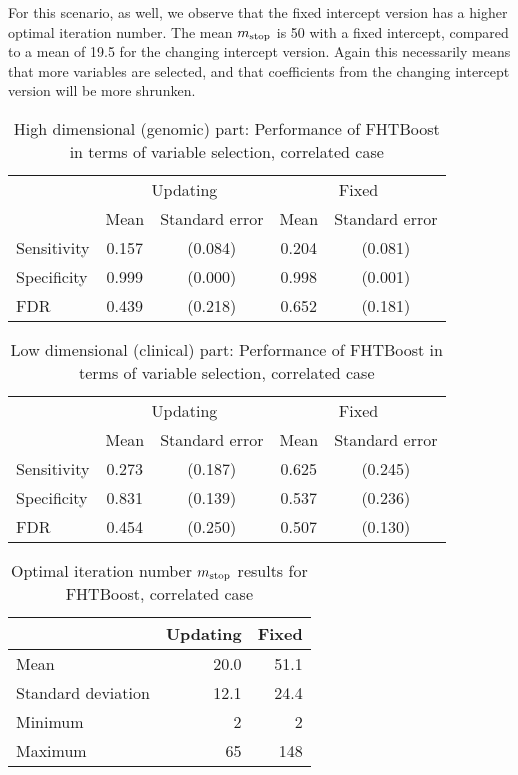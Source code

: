 For this scenario, as well, we observe that the fixed intercept version has a higher optimal iteration number.
The mean $m_{\text{stop}}$ is 50 with a fixed intercept, compared to a mean of 19.5 for the changing intercept version.
Again this necessarily means that more variables are selected, and that coefficients from the changing intercept version will be more shrunken.

\begin{table}
\caption{High dimensional (genomic) part: Performance of FHTBoost in terms of variable selection, correlated case}
\label{table:correlated-y0}
\centering
\begin{tabular}{l|cc|cc}
\toprule
& \multicolumn{2}{c}{Updating} & \multicolumn{2}{c}{Fixed} \\
& Mean & Standard error & Mean & Standard error \\
\hline
Sensitivity & 0.157 & (0.084) & 0.204 & (0.081) \\
Specificity & 0.999 & (0.000) & 0.998 & (0.001) \\
FDR         & 0.439 & (0.218) & 0.652 & (0.181) \\
\bottomrule
\end{tabular}
\end{table}

\begin{table}
\caption{Low dimensional (clinical) part: Performance of FHTBoost in terms of variable selection, correlated case}
\label{table:correlated-mu}
\centering
\begin{tabular}{l|cc|cc}
\toprule
& \multicolumn{2}{c}{Updating} & \multicolumn{2}{c}{Fixed} \\
& Mean & Standard error & Mean & Standard error \\
\hline
Sensitivity & 0.273 & (0.187) & 0.625 & (0.245) \\
Specificity & 0.831 & (0.139) & 0.537 & (0.236) \\
FDR         & 0.454 & (0.250) & 0.507 & (0.130) \\
\bottomrule
\end{tabular}
\end{table}

\begin{table}
\caption{Optimal iteration number $m_{\text{stop}}$ results for FHTBoost, correlated case}
\label{table:correlated-mstop}
\centering
\begin{tabular}{l|rr}
\toprule
& Updating & Fixed \\
\hline
Mean               &  20.0  &  51.1  \\
Standard deviation &  12.1  &  24.4  \\
Minimum            &     2  &     2  \\
Maximum            &    65  &   148  \\
\bottomrule
\end{tabular}
\end{table}

